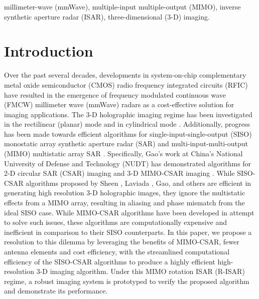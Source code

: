 \documentclass[conference]{IEEEtran}
\begin{document}
		\begin{IEEEkeywords}
			millimeter-wave (mmWave), multiple-input multiple-output (MIMO), inverse synthetic aperture radar (ISAR), three-dimensional (3-D) imaging.
		\end{IEEEkeywords}
		
		
		\section{Introduction}
		\label{sec:introduction}
		Over the past several decades, developments in system-on-chip complementary metal oxide semiconductor (CMOS) radio frequency integrated circuits (RFIC) have resulted in the emergence of frequency modulated continuous wave (FMCW) millimeter wave (mmWave) radars as a cost-effective solution for imaging applications. The 3-D holographic imaging regime has been investigated in the rectilinear (planar) mode \cite{Yanik:MillimeterWaveNearFieldImaging,Qiao:PlanarSAR} and in cylindrical mode \cite{Sheen:NearField3DRadarImaging}. Additionally, progress has been made towards efficient algorithms for single-input-single-output (SISO) monostatic array synthetic aperture radar (SAR) \cite{Sheen:3DmmWaveImagingSISO} and multi-input-multi-output (MIMO) multistatic array SAR \cite{Zhuge:3DmmWaveImagingMIMO}. Specifically, Gao's work at China's National University of Defense and Technology (NUDT) has demonstrated algorithms for 2-D circular SAR (CSAR) imaging \cite{Gao:CSAR2D} and 3-D MIMO-CSAR imaging \cite{Gao:EfficientAlgorithmMIMOCylindrical}. While SISO-CSAR algorithms proposed by Sheen \cite{Sheen:CSARPatent}, Laviada \cite{Laviada:ECSAR}, Gao, and others are efficient in generating high resolution 3-D holographic images, they ignore the multistatic effects from a MIMO array, resulting in aliasing and phase mismatch from the ideal SISO case. While MIMO-CSAR algorithms have been developed in attempt to solve such issues, these algorithms are computationally expensive and inefficient in comparison to their SISO counterparts. In this paper, we propose a resolution to this dilemma by leveraging the benefits of MIMO-CSAR, fewer antenna elements and cost efficiency, with the streamlined computational efficiency of the SISO-CSAR algorithms to produce a highly efficient high-resolution 3-D imaging algorithm. Under this MIMO rotation ISAR (R-ISAR) regime, a robust imaging system is prototyped to verify the proposed algorithm and demonstrate its performance.
		
\end{document}
